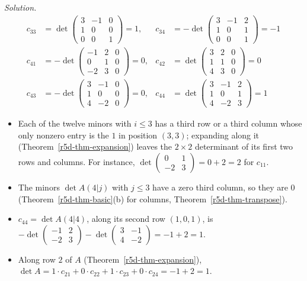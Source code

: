 \documentclass[12pt]{article}
\theoremstyle{definition}
\newenvironment{solution}{\par\noindent\textit{Solution.}\ }{\par\smallskip}
\begin{document}
\begin{solution}
\[\begin{aligned}
c_{33}&=\det\left(\begin{smallmatrix}3&-1&0\\1&0&0\\0&0&1\end{smallmatrix}\right)=1,&
c_{34}&=-\det\left(\begin{smallmatrix}3&-1&2\\1&0&1\\0&0&1\end{smallmatrix}\right)=-1\\
c_{41}&=-\det\left(\begin{smallmatrix}-1&2&0\\0&1&0\\-2&3&0\end{smallmatrix}\right)=0,&
c_{42}&=\det\left(\begin{smallmatrix}3&2&0\\1&1&0\\4&3&0\end{smallmatrix}\right)=0\\
c_{43}&=-\det\left(\begin{smallmatrix}3&-1&0\\1&0&0\\4&-2&0\end{smallmatrix}\right)=0,&
c_{44}&=\det\left(\begin{smallmatrix}3&-1&2\\1&0&1\\4&-2&3\end{smallmatrix}\right)=1
\end{aligned}
\]
\begin{itemize}
\item Each of the twelve minors with \(i\leqslant3\) has a third row or a third column whose only nonzero entry is the
\(1\) in position \((3,3)\); expanding along it (Theorem~\ref{r5d-thm-expansion}) leaves the \(2\times2\) determinant of
its first two rows and columns. For instance, \(\det\left(\begin{smallmatrix}0&1\\-2&3\end{smallmatrix}\right)=0+2=2\) for
\(c_{11}\).
\item The minors \(\det A(4|j)\) with \(j\leqslant3\) have a zero third column, so they are \(0\)
(Theorem~\ref{r5d-thm-basic}(b) for columns, Theorem~\ref{r5d-thm-transpose}).
\item \(c_{44}=\det A(4|4)\), along its second row \((1,0,1)\), is
\(-\det\left(\begin{smallmatrix}-1&2\\-2&3\end{smallmatrix}\right)-\det\left(\begin{smallmatrix}3&-1\\4&-2\end{smallmatrix}\right)=-1+2=1\).
\item Along row \(2\) of \(A\) (Theorem~\ref{r5d-thm-expansion}), \(\det A=1\cdot c_{21}+0\cdot c_{22}+1\cdot c_{23}+0\cdot c_{24}
=-1+2=1\).
\end{itemize}


\end{solution}
\end{document}
